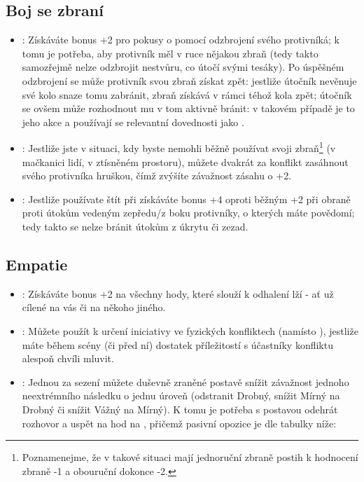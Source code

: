 \documentclass[../main.tex]{subfiles}
\begin{document}
\subsection{Boj se zbraní}
\label{sec:trik-bsz}
\begin{itemize}
\item{}:
  Získáváte bonus +2 pro pokusy o  pomocí odzbrojení svého protivníká; k tomu je potřeba, aby protivník měl v ruce nějakou zbraň (tedy takto samozřejmě nelze odzbrojit nestvůru, co útočí svými tesáky). Po úspěšném odzbrojení se může protivník svou zbraň získat zpět: jestliže útočník nevěnuje své kolo snaze tomu zabránit, zbraň získává v rámci téhož kola zpět; útočník se ovšem může rozhodnout mu v tom aktivně bránit: v takovém případě je to jeho akce a používají se relevantní dovednosti jako .

\item{}:
\label{sec:bsz-hruska}
Jestliže jste v situaci, kdy byste nemohli běžně používat svoji zbraň\footnote{Poznamenejme, že v takové situaci mají jednoruční zbraně postih k hodnocení zbraně -1 a obouruční dokonce -2.} (v mačkanici lidí, v ztísněném prostoru), můžete dvakrát za konflikt zasáhnout svého protivníka hruškou, čímž zvýšíte závažnost zásahu o +2.

\item{}:
  \label{sec:bsz-stitar}
Jestliže používate štít při  získáváte bonus +4 oproti běžným +2 při obraně proti útokům vedeným zepředu/z boku protivníky, o kterých máte povědomí; tedy takto se nelze bránit útokům z úkrytu či zezad. 
\end{itemize}



\subsection{Empatie}
\label{sec:trik-empatie}

\begin{itemize}
\item{}:
\label{sec:empatie-odhalovani} Získáváte bonus +2 na všechny hody, které slouží k odhalení lží - ať už cílené na vás či na někoho jiného.

\item{}:
\label{sec:empatie-cit} Můžete použít  k určení iniciativy ve fyzických konfliktech (namísto ), jestliže máte během scény (či před ní) dostatek příležitostí s účastníky konfliktu alespoň chvíli mluvit.

\item{}:
\label{sec:empatie-terapuet} Jednou za sezení můžete duševně zraněné postavě snížit závažnost jednoho neextrémního následku o jednu úroveň (odstranit Drobný, snížit Mírný na Drobný či snížit Vážný na Mírný). K tomu je potřeba s postavou odehrát rozhovor a uspět na hod na , přičemž pasivní opozice je dle tabulky níže:
\end{itemize}
\end{document}

